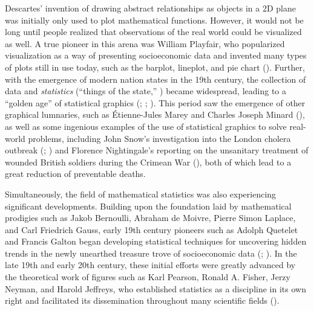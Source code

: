 \documentclass[
]{book}
\begin{document}
Descartes' invention of drawing abstract relationships as objects in a 2D plane was initially only used to plot mathematical functions. However, it would not be long until people realized that observations of the real world could be visualized as well. A true pioneer in this arena was William Playfair, who popularized visualization as a way of presenting socioeconomic data and invented many types of plots still in use today, such as the barplot, lineplot, and pie chart (). Further, with the emergence of modern nation states in the 19th century, the collection of data and \emph{statistics} (``things of the state,'' ) became widespread, leading to a ``golden age'' of statistical graphics (; ; ). This period saw the emergence of other graphical lumnaries, such as Étienne-Jules Marey and Charles Joseph Minard (), as well as some ingenious examples of the use of statistical graphics to solve real-world problems, including John Snow's investigation into the London cholera outbreak (; ) and Florence Nightingale's reporting on the unsanitary treatment of wounded British soldiers during the Crimean War (), both of which lead to a great reduction of preventable deaths.

Simultaneously, the field of mathematical statistics was also experiencing significant developments. Building upon the foundation laid by mathematical prodigies such as Jakob Bernoulli, Abraham de Moivre, Pierre Simon Laplace, and Carl Friedrich Gauss, early 19th century pioneers such as Adolph Quetelet and Francis Galton began developing statistical techniques for uncovering hidden trends in the newly unearthed treasure trove of socioeconomic data (; ). In the late 19th and early 20th century, these initial efforts were greatly advanced by the theoretical work of figures such as Karl Pearson, Ronald A. Fisher, Jerzy Neyman, and Harold Jeffreys, who established statistics as a discipline in its own right and facilitated its dissemination throughout many scientific fields ().
\end{document}
